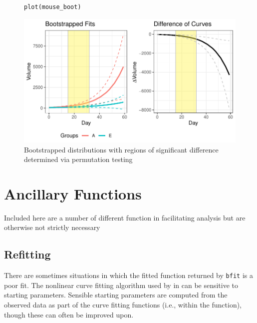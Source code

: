 \begin{figure}[H]
\centering
\begin{BVerbatim}
plot(mouse_boot)
\end{BVerbatim}

\includegraphics{img/mouse_boot_plot.pdf}
\caption{Bootstrapped distributions with regions of significant difference determined via permutation testing}
\end{figure}
%
%
%
%


\section{Ancillary Functions}\label{sec:anc_func}

Included here are a number of different function in  facilitating  analysis but are otherwise not strictly necessary

\subsection{Refitting}

There are sometimes situations in which the fitted function returned by \texttt{bfit} is a poor fit. The nonlinear curve fitting algorithm used by  in  can be sensitive to starting parameters. Sensible starting parameters are computed from the observed data as part of the curve fitting functions (i.e., within the  function), though these can often be improved upon.


